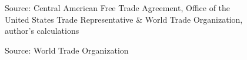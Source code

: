 \documentclass[12pt]{article}
\begin{document}
\begin{figure}[H]

\caption{\label{fig:Graph3}}
Source: Central American Free Trade Agreement, Office of the United States Trade Representative \&
World Trade Organization, author's calculations
\end{figure}

\begin{figure}[H]

\caption{\label{fig:Graph4}}
Source: World Trade Organization
\end{figure}
\end{document}
